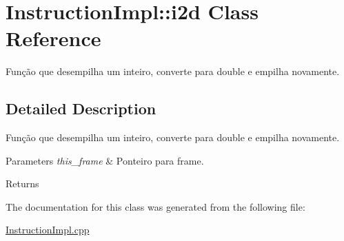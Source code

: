 \hypertarget{class_instruction_impl_1_1i2d}{}\section{Instruction\+Impl\+:\+:i2d Class Reference}
\label{class_instruction_impl_1_1i2d}


Função que desempilha um inteiro, converte para double e empilha novamente.  




\subsection{Detailed Description}
Função que desempilha um inteiro, converte para double e empilha novamente. 


\begin{DoxyParams}{Parameters}
{\em this\+\_\+frame} & Ponteiro para frame. \\
\hline
\end{DoxyParams}
\begin{DoxyReturn}{Returns}

\end{DoxyReturn}


The documentation for this class was generated from the following file\+:\begin{DoxyCompactItemize}
\item 
\hyperlink{_instruction_impl_8cpp}{Instruction\+Impl.\+cpp}\end{DoxyCompactItemize}
